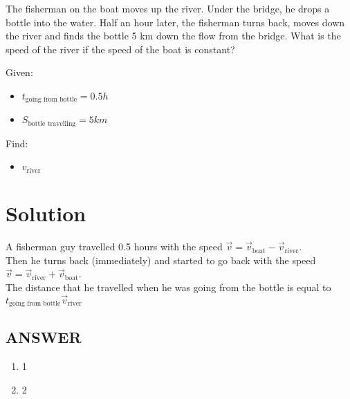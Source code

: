 The fisherman on the boat moves up the river. Under the bridge, he drops a bottle into the water.
Half an hour later, the fisherman turns back, moves down the river and finds the bottle 5 km
down the flow from the bridge. What is the speed of the river if the speed of the boat is constant?

\bigbreak Given: \begin{itemize}
    \item $t_{\text{going from bottle}} = 0.5h$
    \item $S_{\text{bottle travelling}} = 5km$
\end{itemize}

Find: \begin{itemize}
    \item $v_{\text{river}}$
\end{itemize}

\section*{Solution}

A fisherman guy travelled 0.5 hours with the speed $\Vec{v} = \Vec{v}_{\text{boat}} - \Vec{v}_{\text{river}}$.
\\ Then he turns back (immediately) and started to go back with the speed $\Vec{v} = \Vec{v}_{\text{river}} + \Vec{v}_{\text{boat}}$.
\\ The distance that he travelled when he was going from the bottle is equal to $t_{\text{going from bottle}} \Vec{v}_{\text{river}}$ 



\vfill
\subsection*{ANSWER}
\begin{enumerate}
    \item 1
    \item 2
\end{enumerate}

